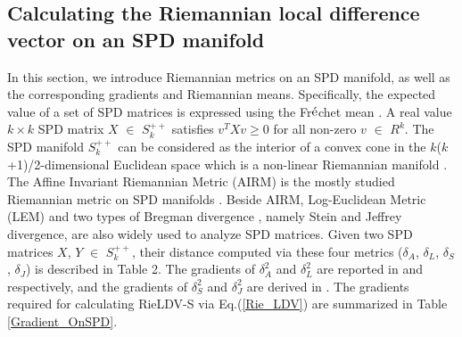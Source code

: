 \documentclass[review]{elsarticle}
\begin{document}
\subsection{Calculating the Riemannian local difference vector on an SPD manifold}
	 In this section, we introduce Riemannian metrics on an SPD manifold, as well as the corresponding gradients and Riemannian means. Specifically, the expected value of a set of SPD matrices is expressed using the Fr$\acute{\rm e}$chet mean \cite{nielsen2013matrix}.
	 A real value $k \times k$ SPD matrix $X$ $\in$ $S_k^{++}$ satisfies $v^TXv$$\ge$0 for all non-zero $v$ $\in$ $R^k$. The SPD manifold $S_k^{++}$ can be considered as the interior of a convex cone in the $k$($k$+1)/2-dimensional Euclidean space which is a non-linear Riemannian manifold \cite{harandi2014manifold,harandi2018dimensionality}. The Affine Invariant Riemannian Metric (AIRM) is the mostly studied Riemannian metric on SPD manifolds \cite{pennec2006riemannian}. Beside AIRM, Log-Euclidean Metric (LEM) \cite{arsigny2007geometric} and two types of Bregman divergence \cite{kulis2009low}, namely Stein \cite{sra2012new} and Jeffrey \cite{wang2004affine} divergence, are also widely used to analyze SPD matrices. Given two SPD matrices $X$, $Y$ $\in$ $S_k^{++}$, their distance computed via these four metrics ($\delta_A$, $\delta_L$, $\delta_S$, $\delta_J$) is described in Table 2.  The gradients of $\delta_A^2$ and $\delta_L^2$ are reported in \cite{pennec2006riemannian} and \cite{arsigny2007geometric} 
respectively, and the gradients of $\delta_S^2$ and $\delta_J^2$ are derived  in \cite{cherian2013jensen}. The gradients required for calculating RieLDV-S via {Eq.(\ref{Rie_LDV})} are summarized in Table \ref{Gradient_OnSPD}. 
\end{document}

